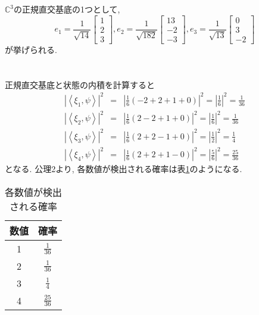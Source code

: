 \documentclass[a4paper,11pt]{jsarticle}
\begin{document}
\section{}
$\mathbb{C}^3$の正規直交基底の1つとして, 
\[
  e_1 = \frac{1}{\sqrt{14}}\begin{bmatrix}
    1 \\ 2 \\ 3
  \end{bmatrix}, 
  e_2 = \frac{1}{\sqrt{182}}\begin{bmatrix}
    13 \\ -2 \\ -3
  \end{bmatrix},
  e_3 = \frac{1}{\sqrt{13}}\begin{bmatrix}
    0 \\ 3 \\ -2
  \end{bmatrix}
\]
が挙げられる.

\section{}
正規直交基底と状態の内積を計算すると
\begin{eqnarray*}
  |\left<\xi_1, \psi\right>|^2
  &=& \left|\frac{1}{6}(-2 + 2 + 1 + 0)\right|^2
  = \left|\frac{1}{6}\right|^2 = \frac{1}{36} \\
  |\left<\xi_2, \psi\right>|^2
  &=& \left|\frac{1}{6}(2 - 2 + 1 + 0)\right|^2
  = \left|\frac{1}{6}\right|^2 = \frac{1}{36} \\
  |\left<\xi_3, \psi\right>|^2
  &=& \left|\frac{1}{6}(2 + 2 - 1 + 0)\right|^2
  = \left|\frac{1}{2}\right|^2 = \frac{1}{4} \\
  |\left<\xi_4, \psi\right>|^2
  &=& \left|\frac{1}{6}(2 + 2 + 1 - 0)\right|^2
  = \left|\frac{5}{6}\right|^2 = \frac{25}{36}
\end{eqnarray*}
となる. 公理2より, 各数値が検出される確率は表\ref{prob}のようになる.
\begin{table}[hbtp]
  \caption{各数値が検出される確率}
  \label{prob}
  \centering
  \begin{tabular}{|c|c|}
    \hline
    数値 & 確率 \\
    \hline
    1 & $\frac{1}{36}$ \\
    \hline
    2 & $\frac{1}{36}$ \\
    \hline
    3 & $\frac{1}{4}$ \\
    \hline
    4 & $\frac{25}{36}$ \\
    \hline
  \end{tabular}
\end{table}
\end{document}
